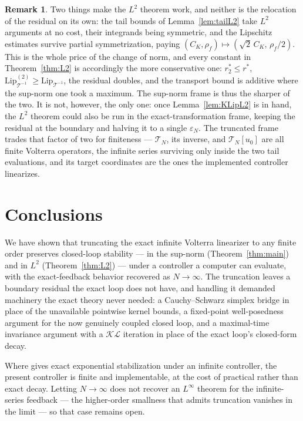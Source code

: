 \documentclass[amsthm]{autart}
\theoremstyle{plain}
\theoremstyle{definition}
\newtheorem{remark}{Remark}
\newcommand{\Tcal}{\mathcal{T}}
\newcommand{\Linf}{L^\infty}
\newcommand{\Ltwo}{L^2}
\newcommand{\LipT}{\mathrm{Lip}_{\Tcal^{-1}}}
\newcommand{\eps}{\varepsilon}
\begin{document}
\begin{remark}\label{rem:L2frames}
Two things make the $\Ltwo$ theorem work, and neither is the relocation of the residual on its own: the tail bounds of Lemma~\ref{lem:tailL2} take $\Ltwo$ arguments at no cost, their integrands being symmetric, and the Lipschitz estimates survive partial symmetrization, paying $(C_K, \rho_f) \mapsto (\sqrt{2}\,C_K,\, \rho_f/2)$. This is the whole price of the change of norm, and every constant in Theorem~\ref{thm:L2} is accordingly the more conservative one: $r_2^* \le r^*$, $\LipT^{(2)} \ge \LipT$, the residual doubles, and the transport bound is additive where the sup-norm one took a maximum. The sup-norm frame is thus the sharper of the two. It is not, however, the only one: once Lemma~\ref{lem:KLipL2} is in hand, the $\Ltwo$ theorem could also be run in the exact-transformation frame, keeping the residual at the boundary and halving it to a single $\eps_N$. The truncated frame trades that factor of two for finiteness --- $\Tcal_N$, its inverse, and $\Tcal_N[u_0]$ are all finite Volterra operators, the infinite series surviving only inside the two tail evaluations, and its target coordinates are the ones the implemented controller linearizes.
\end{remark}

\section{Conclusions}\label{sec:conclusions}

We have shown that truncating the exact infinite Volterra linearizer to any finite order preserves closed-loop stability --- in the sup-norm (Theorem~\ref{thm:main}) and in $\Ltwo$ (Theorem~\ref{thm:L2}) --- under a controller a computer can evaluate, with the exact-feedback behavior recovered as $N \to \infty$. The truncation leaves a boundary residual the exact loop does not have, and handling it demanded machinery the exact theory never needed: a Cauchy--Schwarz simplex bridge in place of the unavailable pointwise kernel bounds, a fixed-point well-posedness argument for the now genuinely coupled closed loop, and a maximal-time invariance argument with a $\mathcal{KL}$ iteration in place of the exact loop's closed-form decay.

Where \cite{krstic2026feedbacklinearizationhyperbolicpdes} gives exact exponential stabilization under an infinite controller, the present controller is finite and implementable, at the cost of practical rather than exact decay. Letting $N \to \infty$ does not recover an $\Linf$ theorem for the infinite-series feedback --- the higher-order smallness that admits truncation vanishes in the limit --- so that case remains open.
\end{document}
